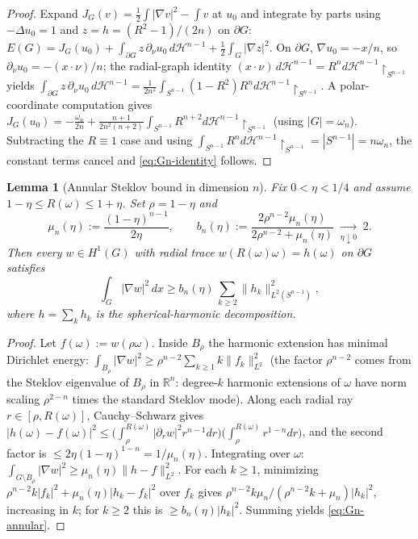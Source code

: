 \documentclass[11pt]{amsart}
\newtheorem{lemma}[theorem]{Lemma}
\newcommand{\R}{\mathbb R}
\newcommand{\HH}{\mathcal H}
\newcommand{\dHnm}{d\mathcal H^{n-1}\!\restriction_{S^{n-1}}}
\begin{document}
\begin{proof}
Expand $J_G(v)=\tfrac12\int|\nabla v|^2-\int v$ at $u_0$ and
integrate by parts using $-\Delta u_0=1$ and $z=h=(R^2-1)/(2n)$ on
$\partial G$:
$E(G)=J_G(u_0)+\int_{\partial G}z\,\partial_\nu u_0\,d\HH^{n-1}
+\tfrac12\int_G|\nabla z|^2$.  On $\partial G$, $\nabla u_0=-x/n$,
so $\partial_\nu u_0=-(x\cdot\nu)/n$; the radial-graph identity
$(x\cdot\nu)\,d\HH^{n-1}=R^n\dHnm$ yields
$\int_{\partial G}z\,\partial_\nu u_0\,d\HH^{n-1}
=\tfrac{1}{2n^2}\int_{S^{n-1}}(1-R^2)R^n\dHnm$.  A polar-coordinate
computation gives
$J_G(u_0)=-\tfrac{\omega_n}{2n}+\tfrac{n+1}{2n^2(n+2)}\int_{S^{n-1}}
R^{n+2}\dHnm$ (using $|G|=\omega_n$).  Subtracting the $R\equiv 1$
case and using $\int_{S^{n-1}}R^n\dHnm=|S^{n-1}|=n\omega_n$, the
constant terms cancel and \eqref{eq:Gn-identity} follows.
\end{proof}

\begin{lemma}[Annular Steklov bound in dimension $n$]
\label{lem:Gn-annular}
Fix $0<\eta<1/4$ and assume $1-\eta\le R(\omega)\le 1+\eta$.  Set
$\rho=1-\eta$ and
\[
   \mu_n(\eta):=\frac{(1-\eta)^{n-1}}{2\eta},
   \qquad
   b_n(\eta):=\frac{2\rho^{n-2}\mu_n(\eta)}
                    {2\rho^{n-2}+\mu_n(\eta)}
   \;\xrightarrow[\eta\downarrow 0]{}\;2.
\]
Then every $w\in H^1(G)$ with radial trace
$w(R(\omega)\omega)=h(\omega)$ on $\partial G$ satisfies
\begin{equation}\label{eq:Gn-annular}
   \int_G|\nabla w|^{2}\,dx
      \ge b_n(\eta)\,\sum_{k\ge 2}\|h_k\|_{L^2(S^{n-1})}^{2},
\end{equation}
where $h=\sum_k h_k$ is the spherical-harmonic decomposition.
\end{lemma}

\begin{proof}
Let $f(\omega):=w(\rho\omega)$.  Inside $B_\rho$ the harmonic
extension has minimal Dirichlet energy:
$\int_{B_\rho}|\nabla w|^2\ge\rho^{n-2}\sum_{k\ge 1}k\|f_k\|_{L^2}^2$
(the factor $\rho^{n-2}$ comes from the Steklov eigenvalue of
$B_\rho$ in $\R^n$: degree-$k$ harmonic extensions of $\omega$ have
norm scaling $\rho^{2-n}$ times the standard Steklov mode).
Along each radial ray $r\in[\rho,R(\omega)]$, Cauchy--Schwarz gives
\(|h(\omega)-f(\omega)|^2
\le\bigl(\int_\rho^{R(\omega)}|\partial_r w|^2 r^{n-1}dr\bigr)
\bigl(\int_\rho^{R(\omega)}r^{1-n}dr\bigr)\),
and the second factor is $\le 2\eta(1-\eta)^{1-n}=1/\mu_n(\eta)$.
Integrating over $\omega$:
$\int_{G\setminus B_\rho}|\nabla w|^2\ge\mu_n(\eta)\|h-f\|_{L^2}^2$.
For each $k\ge 1$, minimizing $\rho^{n-2}k|f_k|^2+\mu_n(\eta)|h_k-
f_k|^2$ over $f_k$ gives $\rho^{n-2}k\mu_n/(\rho^{n-2}k+\mu_n)|h_k|
^2$, increasing in $k$; for $k\ge 2$ this is $\ge b_n(\eta)|h_k|^2$.
Summing yields \eqref{eq:Gn-annular}.
\end{proof}
\end{document}
